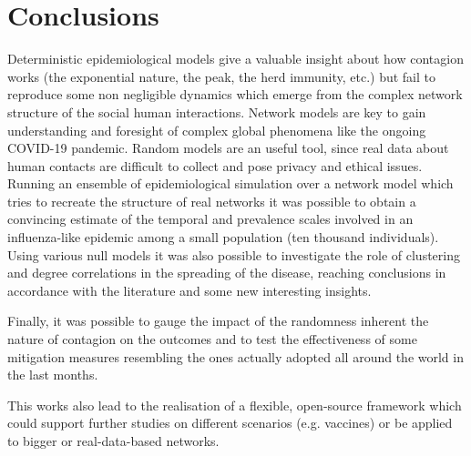 \documentclass[DIV=12, BCOR=0pt]{scrartcl}  %
\begin{document}
	
	\section{Conclusions}
	Deterministic epidemiological models give a valuable insight about how contagion works (the exponential nature, the peak, the herd immunity, etc.) but fail to reproduce some non negligible dynamics which emerge from the complex network structure of the social human interactions. Network models are key to gain understanding and foresight of complex global phenomena like the ongoing COVID-19 pandemic. Random models are an useful tool, since real data about human contacts are difficult to collect and pose privacy and ethical issues.\\
	
	Running an ensemble of epidemiological simulation over a network model which tries to recreate the structure of real networks \citep{Holme} it was possible to obtain a convincing estimate of the temporal and prevalence scales involved in an influenza-like epidemic among a small population (ten thousand individuals). 
	Using various null models it was also possible to investigate the role of clustering and degree correlations in the spreading of the disease, reaching conclusions in accordance with the literature and some new interesting insights.
	
	Finally, it was possible to gauge the impact of the randomness inherent the nature of contagion on the outcomes and to test the effectiveness of some mitigation measures resembling the ones actually adopted all around the world in the last months.
	
	This works also lead to the realisation of a flexible, open-source framework
	 \citep{pyndemic} 
	 which could support further studies on different scenarios (e.g. vaccines) or be applied to bigger or real-data-based networks.
	
%


 
%		
	\clearpage
	\small
	
\end{document}
